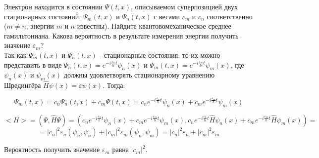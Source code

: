 \documentclass[__main__.tex]{subfiles}
\begin{document}
Электрон находится в состоянии $\Psi(t,x)$, описываемом суперпозицией двух стационарных состояний, $\Psi_m(t,x)$ и $\Psi_n(t,x)$ с весами $c_m$ и $c_n$ соответственно ($m\neq n$, энергии $m$ и $n$ известны). Найдите квантовомеханическое среднее гамильтониана. Какова вероятность в результате измерения энергии получить значение $\varepsilon_m$?\\ 

Так как $\Psi_m(t, x)$ и $\Psi_n(t, x)$ - стационарные состояния, то их можно представить в виде $\Psi_n(t, x) = e^{-i\frac{\varepsilon_n}{\hbar} t} \psi_n(x)$ и $\Psi_m(t, x) =  e^{-i \frac{\varepsilon_m}{\hbar} t} \psi_m(x)$, где $\psi_n(x)$ и $\psi_m(x)$ должны удовлетворять стационарному уравнению Шредингёра  $\hat{H}\psi(x) = \varepsilon \psi(x)$. Тогда:

$$\Psi_m(t, x) = c_n \Psi_n(t, x) + c_m \Psi(t, x) = c_n e^{-i\frac{\varepsilon_n}{\hbar} t} \psi_n(x) + c_m e^{-i \frac{\varepsilon_m}{\hbar} t} \psi_m(x)$$

$$<H> = (\Psi, \hat{H}\Psi) = ( c_n e^{-i\frac{\varepsilon_n}{\hbar} t} \psi_n(x) + c_m e^{-i \frac{\varepsilon_m}{\hbar} t} \psi_m(x),  c_n e^{-i\frac{\varepsilon_n}{\hbar} t} \hat{H} \psi_n(x) + c_m e^{-i \frac{\varepsilon_m}{\hbar} t} \hat{H} \psi_m(x)) =$$
$$ = |c_n|^2\varepsilon_n(\psi_n, \psi_n) + |c_m|^2\varepsilon_m(\psi_n, \psi_m) = |c_n|^2\varepsilon_n + |c_m|^2\varepsilon_m$$

Вероятность получить значение $\varepsilon_m$ равна $|c_m|^2$.
\end{document}
